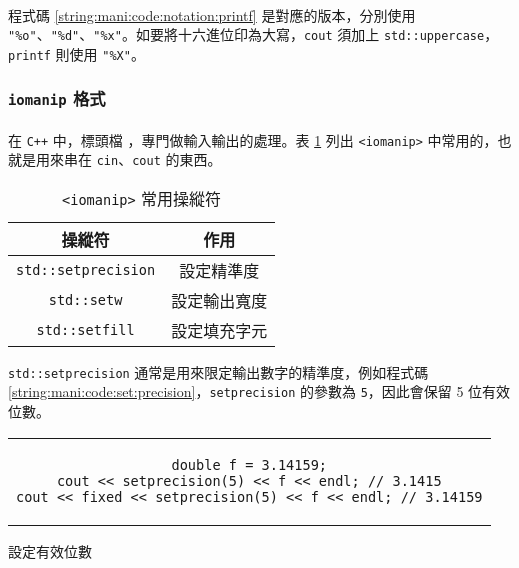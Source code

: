 \documentclass[12pt,a4paper,oneside]{report}
\begin{document}
\begin{CJK}{UTF8}{bkai}
\paragraph{}程式碼 \ref{string:mani:code:notation:printf} 是對應的版本，分別使用 \lstinline!"%o"!、\lstinline!"%d"!、\lstinline!"%x"!。如要將十六進位印為大寫，\lstinline!cout! 須加上 \lstinline!std::uppercase!，\lstinline!printf! 則使用 \lstinline!"%X"!。

\subsubsection{\texttt{iomanip} 格式}

\paragraph{}在 \texttt{C++} 中，標頭檔 ，專門做輸入輸出的處理。表 \ref{string:mani:table:iomanip} 列出 \lstinline!<iomanip>!
中常用的，也就是用來串在 \lstinline!cin!、\lstinline!cout! 的東西。

\begin{table}[h!]
  \centering
  \begin{tabular}{|c|c|}
  \hline
  \textbf{操縱符} & \textbf{作用}\\
  \hline\hline
  \lstinline!std::setprecision! & 設定精準度\\
  \hline
  \lstinline!std::setw! & 設定輸出寬度\\
  \hline
  \lstinline!std::setfill! & 設定填充字元\\
  \hline
  \end{tabular}
  \caption{\lstinline!<iomanip>! 常用操縱符}
  \label{string:mani:table:iomanip}
\end{table}

\lstinline!std::setprecision! 通常是用來限定輸出數字的精準度，例如程式碼 \ref{string:mani:code:set:precision}，\lstinline!setprecision! 的參數為 \lstinline!5!，因此會保留 5 位有效位數。

\begin{code}[h!]
  \centering
  \begin{tabular}{c}
  \begin{lstlisting}
double f = 3.14159;
cout << setprecision(5) << f << endl; // 3.1415
cout << fixed << setprecision(5) << f << endl; // 3.14159
  \end{lstlisting}
  \end{tabular}
  \caption{設定有效位數}
  \label{string:mani:code:set:precision}
\end{code}


\end{CJK}
\end{document}
